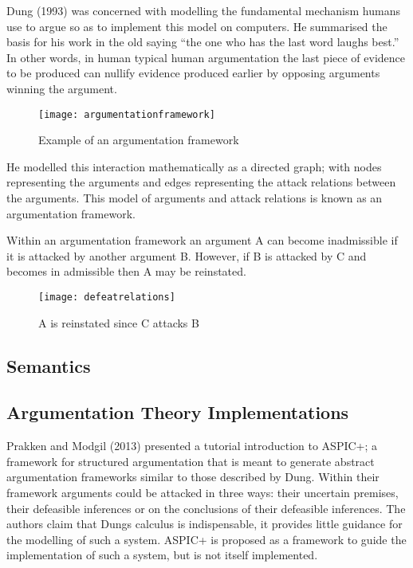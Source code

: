 Dung (1993) was concerned with modelling the fundamental mechanism humans use to argue so as to implement this model on computers. He summarised the basis for his work in the old saying “the one who has the last word laughs best.” In other words, in human typical human argumentation the last piece of evidence to be produced can nullify evidence produced earlier by opposing arguments winning the argument.

\begin{figure}[h]
\caption{Example of an argumentation framework}
\centering
\texttt{[image: argumentationframework]}
\end{figure}

He modelled this interaction mathematically as a directed graph; with nodes representing the arguments and edges representing the attack relations between the arguments. This model of arguments and attack relations is known as an argumentation framework.

Within an argumentation framework an argument A can become inadmissible if it is attacked by another argument B. However, if B is attacked by C and becomes in admissible then A may be reinstated.

\begin{figure}[h]
\caption{A is reinstated since C attacks B}
\centering
\texttt{[image: defeatrelations]}
\end{figure}

\subsection{Semantics}

\subsection{Argumentation Theory Implementations}

Prakken and Modgil (2013) presented a tutorial introduction to ASPIC+; a framework for structured argumentation that is meant to generate abstract argumentation frameworks similar to those described by Dung. Within their framework arguments could be attacked in three ways: their uncertain premises, their defeasible inferences or on the conclusions of their defeasible inferences. The authors claim that Dungs calculus is indispensable, it provides little guidance for the modelling of such a system. ASPIC+ is proposed as a framework to guide the implementation of such a system, but is not itself implemented.

